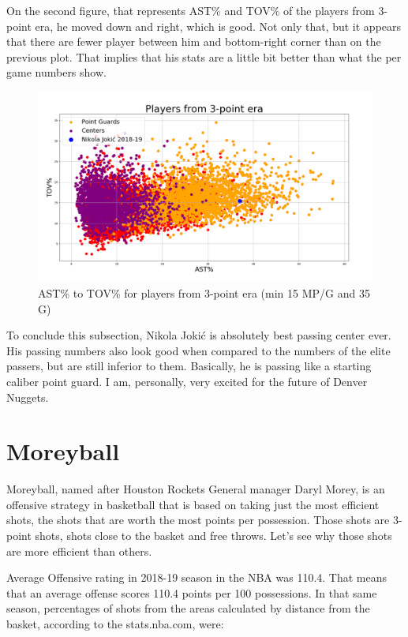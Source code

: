 \documentclass[a4paper]{article}
\begin{document}
On the second figure, that represents AST\% and TOV\% of the players from 3-point era, he moved down and right, which is good. Not only that, but it appears that there are fewer player between him and bottom-right corner than on the previous plot. That implies that his stats are a little bit better than what the per game numbers show.

\begin{figure}[h!]
\begin{center}
\includegraphics[scale=0.30]{ast_tov_pct_3point_era.png}
\end{center}
\caption{AST\% to TOV\% for players from 3-point era (min 15 MP/G and 35 G)}
\label{plt:ast_tov_pct_3p}
\end{figure}

To conclude this subsection, Nikola Joki\' c is absolutely best passing center ever. His passing numbers also look good when compared to the numbers of the elite passers, but are still inferior to them. Basically, he is passing like a starting caliber point guard. I am, personally, very excited for the future of Denver Nuggets.

\pagebreak

\section{Moreyball}
\label{moreyball}

Moreyball, named after Houston Rockets General manager Daryl Morey, is an offensive strategy in basketball that is based on taking just the most efficient shots, the shots that are worth the most points per possession. Those shots are 3-point shots, shots close to the basket and free throws. Let's see why those shots are more efficient than others.

Average Offensive rating in 2018-19 season in the NBA was 110.4. That means that an average offense scores 110.4 points per 100 possessions. In that same season, percentages of shots from the areas calculated by distance from the basket, according to the stats.nba.com, were:
\end{document}
